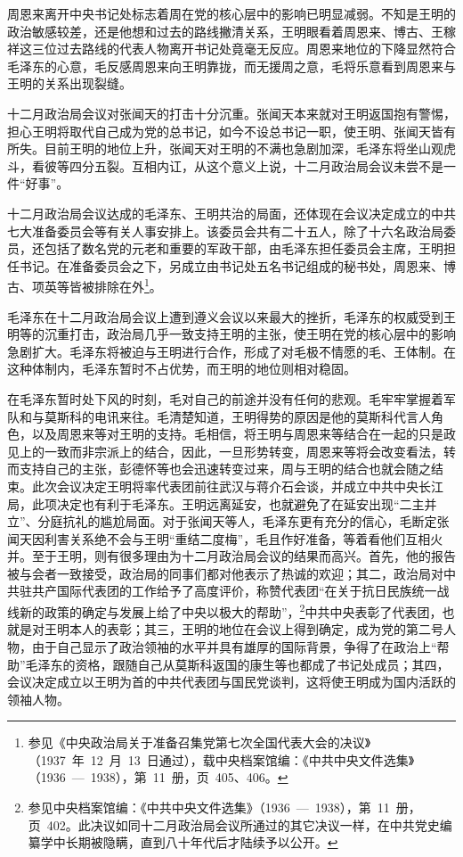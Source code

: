 周恩来离开中央书记处标志着周在党的核心层中的影响已明显减弱。不知是王明的政治敏感较差，还是他想和过去的路线撇清关系，王明眼看着周恩来、博古、王稼祥这三位过去路线的代表人物离开书记处竟毫无反应。周恩来地位的下降显然符合毛泽东的心意，毛反感周恩来向王明靠拢，而无援周之意，毛将乐意看到周恩来与王明的关系出现裂缝。

十二月政治局会议对张闻天的打击十分沉重。张闻天本来就对王明返国抱有警惕，担心王明将取代自己成为党的总书记，如今不设总书记一职，使王明、张闻天皆有所失。目前王明的地位上升，张闻天对王明的不满也急剧加深，毛泽东将坐山观虎斗，看彼等四分五裂。互相内讧，从这个意义上说，十二月政治局会议未尝不是一件“好事”。

十二月政治局会议达成的毛泽东、王明共治的局面，还体现在会议决定成立的中共七大准备委员会等有关人事安排上。该委员会共有二十五人，除了十六名政治局委员，还包括了数名党的元老和重要的军政干部，由毛泽东担任委员会主席，王明担任书记。在准备委员会之下，另成立由书记处五名书记组成的秘书处，周恩来、博古、项英等皆被排除在外\footnote{参见《中央政治局关于准备召集党第七次全国代表大会的决议》（1937~年~12~月~13~日通过），载中央档案馆编：《中共中央文件选集》（1936~—~1938），第~11~册，页~405、406。}。

毛泽东在十二月政治局会议上遭到遵义会议以来最大的挫折，毛泽东的权威受到王明等的沉重打击，政治局几乎一致支持王明的主张，使王明在党的核心层中的影响急剧扩大。毛泽东将被迫与王明进行合作，形成了对毛极不情愿的毛、王体制。在这种体制内，毛泽东暂时不占优势，而王明的地位则相对稳固。

在毛泽东暂时处下风的时刻，毛对自己的前途并没有任何的悲观。毛牢牢掌握着军队和与莫斯科的电讯来往。毛清楚知道，王明得势的原因是他的莫斯科代言人角色，以及周恩来等对王明的支持。毛相信，将王明与周恩来等结合在一起的只是政见上的一致而非宗派上的结合，因此，一旦形势转变，周恩来等将会改变看法，转而支持自己的主张，彭德怀等也会迅速转变过来，周与王明的结合也就会随之结束。此次会议决定王明将率代表团前往武汉与蒋介石会谈，并成立中共中央长江局，此项决定也有利于毛泽东。王明远离延安，也就避免了在延安出现“二主并立”、分庭抗礼的尴尬局面。对于张闻天等人，毛泽东更有充分的信心，毛断定张闻天因利害关系绝不会与王明“重结二度梅”，毛且作好准备，等着看他们互相火并。至于王明，则有很多理由为十二月政治局会议的结果而高兴。首先，他的报告被与会者一致接受，政治局的同事们都对他表示了热诚的欢迎；其二，政治局对中共驻共产国际代表团的工作给予了高度评价，称赞代表团“在关于抗日民族统一战线新的政策的确定与发展上给了中央以极大的帮助”，\footnote{参见中央档案馆编：《中共中央文件选集》（1936~—~1938），第~11~册，页~402。此决议如同十二月政治局会议所通过的其它决议一样，在中共党史编纂学中长期被隐瞒，直到八十年代后才陆续予以公开。}中共中央表彰了代表团，也就是对王明本人的表彰；其三，王明的地位在会议上得到确定，成为党的第二号人物，由于自己显示了政治领袖的水平并具有雄厚的国际背景，争得了在政治上“帮助”毛泽东的资格，跟随自己从莫斯科返国的康生等也都成了书记处成员；其四，会议决定成立以王明为首的中共代表团与国民党谈判，这将使王明成为国内活跃的领袖人物。

